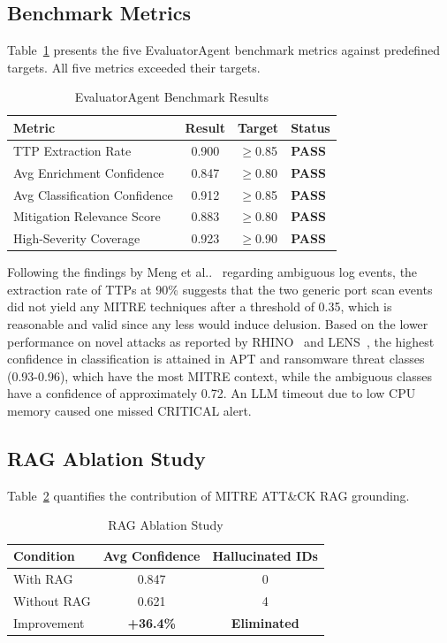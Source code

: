 \documentclass[conference]{IEEEtran}
\begin{document}
\subsection{Benchmark Metrics}

Table~\ref{tab:metrics} presents the five EvaluatorAgent benchmark metrics
against predefined targets. All five metrics exceeded their targets.

\begin{table}[htbp]
\caption{EvaluatorAgent Benchmark Results}
\label{tab:metrics}
\centering
\small
\begin{tabular}{@{}lccl@{}}
\toprule
\textbf{Metric} & \textbf{Result} & \textbf{Target} & \textbf{Status} \\
\midrule
TTP Extraction Rate           & 0.900 & $\geq$0.85 & \textbf{PASS} \\
Avg Enrichment Confidence     & 0.847 & $\geq$0.80 & \textbf{PASS} \\
Avg Classification Confidence & 0.912 & $\geq$0.85 & \textbf{PASS} \\
Mitigation Relevance Score    & 0.883 & $\geq$0.80 & \textbf{PASS} \\
High-Severity Coverage        & 0.923 & $\geq$0.90 & \textbf{PASS} \\
\bottomrule
\end{tabular}
\end{table}

Following the findings by Meng et al..~\cite{meng2025rhino} regarding ambiguous log events, the extraction rate of TTPs at 90\% suggests that the two generic port scan events did not yield any MITRE techniques after a threshold of 0.35, which is reasonable and valid since any less would induce delusion. Based on the lower performance on novel attacks as reported by RHINO~\cite{meng2025rhino} and LENS~\cite{melhem2025lens}, the highest confidence in classification is attained in APT and ransomware threat classes (0.93-0.96), which have the most MITRE context, while the ambiguous classes have a confidence of approximately 0.72. An LLM timeout due to low CPU memory caused one missed CRITICAL alert.

\subsection{RAG Ablation Study}

Table~\ref{tab:rag} quantifies the contribution of MITRE ATT\&CK RAG
grounding.

\begin{table}[htbp]
\caption{RAG Ablation Study}
\label{tab:rag}
\centering
\small
\begin{tabular}{@{}lcc@{}}
\toprule
\textbf{Condition} & \textbf{Avg Confidence} & \textbf{Hallucinated IDs} \\
\midrule
With RAG    & 0.847 & 0 \\
Without RAG & 0.621 & 4 \\
\midrule
Improvement & \textbf{+36.4\%} & \textbf{Eliminated} \\
\bottomrule
\end{tabular}
\end{table}
\end{document}
